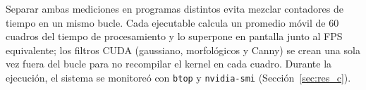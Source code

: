 Separar ambas mediciones en programas distintos evita mezclar contadores de
tiempo en un mismo bucle. Cada ejecutable calcula un promedio móvil de 60
cuadros del tiempo de procesamiento y lo superpone en pantalla junto al FPS
equivalente; los filtros CUDA (gaussiano, morfológicos y Canny) se crean una
sola vez fuera del bucle para no recompilar el kernel en cada cuadro. Durante
la ejecución, el sistema se monitoreó con \texttt{btop} y \texttt{nvidia-smi}
(Sección~\ref{sec:res_c}).
